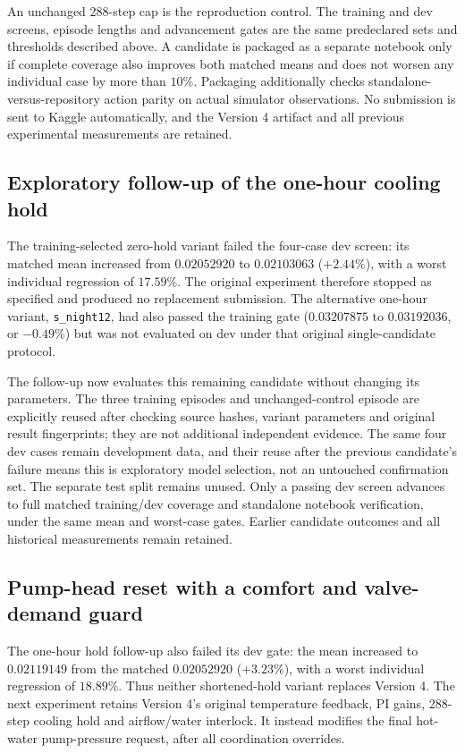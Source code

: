 An unchanged 288-step cap is the reproduction control. The training and
dev screens, episode lengths and advancement gates are the same predeclared
sets and thresholds described above. A candidate is packaged as a separate
notebook only if complete coverage also improves both matched means and
does not worsen any individual case by more than $10\%$. Packaging additionally
checks standalone-versus-repository action parity on actual simulator
observations. No submission is sent to Kaggle automatically, and the Version 4
artifact and all previous experimental measurements are retained.



\subsection{Exploratory follow-up of the one-hour cooling hold}
The training-selected zero-hold variant failed the four-case dev screen:
its matched mean increased from $0.02052920$ to $0.02103063$ ($+2.44\%$),
with a worst individual regression of $17.59\%$. The original experiment
therefore stopped as specified and produced no replacement submission.
The alternative one-hour variant, \texttt{s\_night12}, had also passed the
training gate ($0.03207875$ to $0.03192036$, or $-0.49\%$) but was not
evaluated on dev under that original single-candidate protocol.

The follow-up now evaluates this remaining candidate without changing its
parameters. The three training episodes and unchanged-control episode are
explicitly reused after checking source hashes, variant parameters and
original result fingerprints; they are not additional independent evidence.
The same four dev cases remain development data, and their reuse after the
previous candidate's failure means this is exploratory model selection,
not an untouched confirmation set. The separate test split remains unused.
Only a passing dev screen advances to full matched training/dev coverage and
standalone notebook verification, under the same mean and worst-case gates.
Earlier candidate outcomes and all historical measurements remain retained.



\subsection{Pump-head reset with a comfort and valve-demand guard}
The one-hour hold follow-up also failed its dev gate: the mean increased to
$0.02119149$ from the matched $0.02052920$ ($+3.23\%$), with a worst individual
regression of $18.89\%$. Thus neither shortened-hold variant replaces Version 4.
The next experiment retains Version 4's original temperature feedback, PI gains,
288-step cooling hold and airflow/water interlock. It instead modifies the
final hot-water pump-pressure request, after all coordination overrides.

